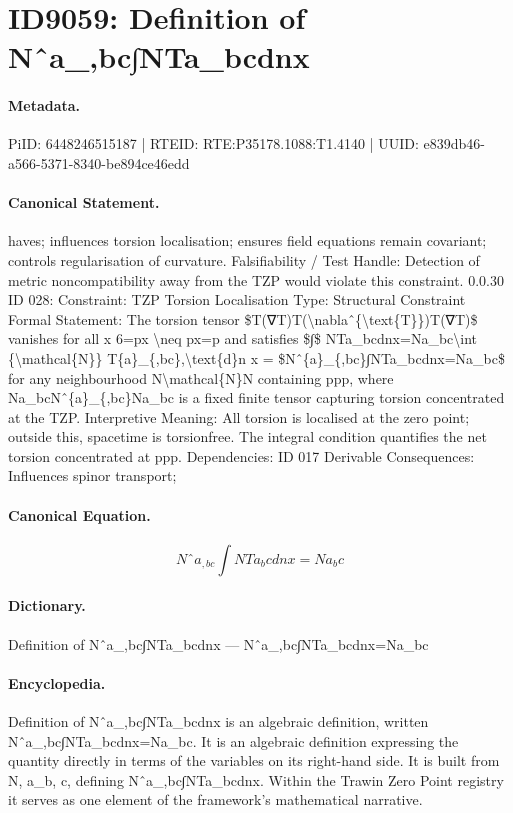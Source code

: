 \section*{ID9059: Definition of Nˆa\_,bc∫NTa\_bcdnx}
\paragraph{Metadata.}
PiID: 6448246515187 | RTEID: RTE:P35178.1088:T1.4140 | UUID: e839db46-a566-5371-8340-be894ce46edd

\paragraph{Canonical Statement.}
haves; influences torsion localisation; ensures field equations remain covariant; controls regularisation of curvature. Falsifiability / Test Handle: Detection of metric noncompatibility away from the TZP would violate this constraint. 0.0.30 ID 028: Constraint: TZP Torsion Localisation Type: Structural Constraint Formal Statement: The torsion tensor \$T(∇T)T(\textbackslash{}nablaˆ\{\textbackslash{}text\{T\}\})T(∇T)\$ vanishes for all x 6=px \textbackslash{}neq px=p and satisfies \$∫\$ NTa\_bcdnx=Na\_bc\textbackslash{}int \{\textbackslash{}mathcal\{N\}\} T\{a\}\_\{,bc\},\textbackslash{}text\{d\}n x = \$Nˆ\{a\}\_\{,bc\}∫NTa\_bcdnx=Na\_bc\$ for any neighbourhood N\textbackslash{}mathcal\{N\}N containing ppp, where Na\_bcNˆ\{a\}\_\{,bc\}Na\_bc is a fixed finite tensor capturing torsion concentrated at the TZP. Interpretive Meaning: All torsion is localised at the zero point; outside this, spacetime is torsionfree. The integral condition quantifies the net torsion concentrated at ppp. Dependencies: ID 017 Derivable Consequences: Influences spinor transport;

\paragraph{Canonical Equation.}
\[
Nˆ{a}_{,bc}∫NTa_bcdnx=Na_bc
\]

\paragraph{Dictionary.}
Definition of Nˆa\_,bc∫NTa\_bcdnx — Nˆa\_,bc∫NTa\_bcdnx=Na\_bc

\paragraph{Encyclopedia.}
Definition of Nˆa\_,bc∫NTa\_bcdnx is an algebraic definition, written Nˆa\_,bc∫NTa\_bcdnx=Na\_bc. It is an algebraic definition expressing the quantity directly in terms of the variables on its right-hand side. It is built from N, a\_b, c, defining Nˆa\_,bc∫NTa\_bcdnx. Within the Trawin Zero Point registry it serves as one element of the framework's mathematical narrative.
